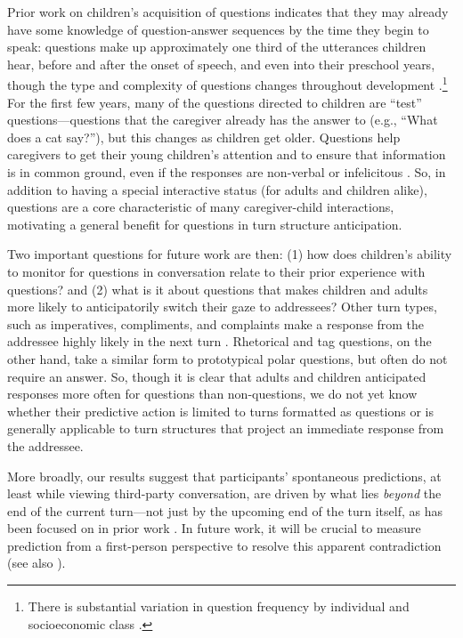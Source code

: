 \documentclass[authoryear, 12pt]{elsarticle}
\begin{document}
Prior work on children's acquisition of questions indicates that they may already have some knowledge of question-answer sequences by the time they begin to speak: questions make up approximately one third of the utterances children hear, before and after the onset of speech, and even into their preschool years, though the type and complexity of questions changes throughout development \citep{casillas2016, fitneva2012, henning2005, shatz1979}.\footnote{There is substantial variation in question frequency by individual and socioeconomic class \citep{hart1992, weisleder2012}.} For the first few years, many of the questions directed to children are ``test'' questions---questions that the caregiver already has the answer to (e.g., ``What does a cat say?''), but this changes as children get older. Questions help caregivers to get their young children's attention and to ensure that information is in common ground, even if the responses are non-verbal or infelicitous \citep{bruner1985, fitneva2012, snow1977}. So, in addition to having a special interactive status (for adults and children alike), questions are a core characteristic of many caregiver-child interactions, motivating a general benefit for questions in turn structure anticipation.

Two important questions for future work are then: (1) how does children's ability to monitor for questions in conversation relate to their prior experience with questions? and (2) what is it about questions that makes children and adults more likely to anticipatorily switch their gaze to addressees? Other turn types, such as imperatives, compliments, and complaints make a response from the addressee highly likely in the next turn \citep{schegloff2007}. Rhetorical and tag questions, on the other hand, take a similar form to prototypical polar questions, but often do not require an answer. So, though it is clear that adults and children anticipated responses more often for questions than non-questions, we do not yet know whether their predictive action is limited to turns formatted as questions or is generally applicable to turn structures that project an immediate response from the addressee. 

More broadly, our results suggest that participants' spontaneous predictions, at least while viewing third-party conversation, are driven by what lies \textit{beyond} the end of the current turn---not just by the upcoming end of the turn itself, as has been focused on in prior work \citep{torreira2015, keitel2013, magyari2012, de-ruiter2006}. In future work, it will be crucial to measure prediction from a first-person perspective to resolve this apparent contradiction (see also \citealp{holler2015}).
\end{document}
